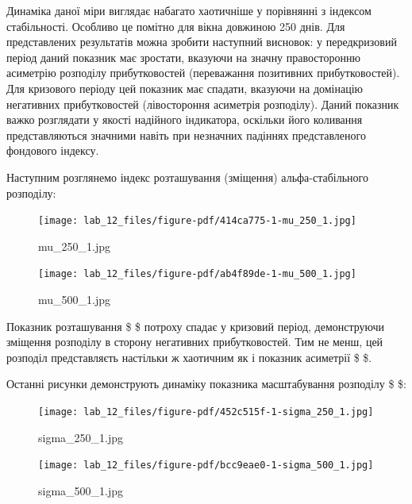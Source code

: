 \documentclass[
  letterpaper,
]{report}
\begin{document}
Динаміка даної міри виглядає набагато хаотичніше у порівнянні з індексом
стабільності. Особливо це помітно для вікна довжиною 250 днів. Для
представлених результатів можна зробити наступний висновок: у
передкризовий період даний показник має зростати, вказуючи на значну
правосторонню асиметрію розподілу прибутковостей (переважання позитивних
прибутковостей). Для кризового періоду цей показник має спадати,
вказуючи на домінацію негативних прибутковостей (лівостороння асиметрія
розподілу). Даний показник важко розглядати у якості надійного
індикатора, оскільки його коливання представляються значними навіть при
незначних падіннях представленого фондового індексу.

Наступним розглянемо індекс розташування (зміщення) альфа-стабільного
розподілу:

\begin{figure}

{\centering \texttt{[image: lab\_12\_files/figure-pdf/414ca775-1-mu\_250\_1.jpg]}

}

\caption{mu\_250\_1.jpg}

\end{figure}

\begin{figure}

{\centering \texttt{[image: lab\_12\_files/figure-pdf/ab4f89de-1-mu\_500\_1.jpg]}

}

\caption{mu\_500\_1.jpg}

\end{figure}

Показник розташування \$ \mu \$ потроху спадає у кризовий період,
демонструючи зміщення розподілу в сторону негативних прибутковостей. Тим
не менш, цей розподіл представляєть настільки ж хаотичним як і показник
асиметрії \$ \beta \$.

Останні рисунки демонструють динаміку показника масштабування розподілу
\$ \sigma \$:

\begin{figure}

{\centering \texttt{[image: lab\_12\_files/figure-pdf/452c515f-1-sigma\_250\_1.jpg]}

}

\caption{sigma\_250\_1.jpg}

\end{figure}

\begin{figure}

{\centering \texttt{[image: lab\_12\_files/figure-pdf/bcc9eae0-1-sigma\_500\_1.jpg]}

}

\caption{sigma\_500\_1.jpg}

\end{figure}
\end{document}
